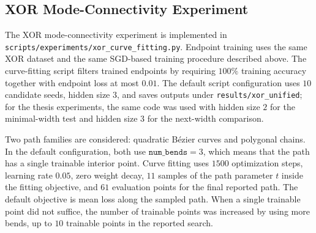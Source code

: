 \documentclass[11pt,a4paper]{report}
\begin{document}
\subsection{XOR Mode-Connectivity Experiment}

The XOR mode-connectivity experiment is implemented in \texttt{scripts/experiments/xor\_curve\_fitting.py}. Endpoint training uses the same XOR dataset and the same SGD-based training procedure described above. The curve-fitting script filters trained endpoints by requiring \(100\%\) training accuracy together with endpoint loss at most \(0.01\). The default script configuration uses \(10\) candidate seeds, hidden size \(3\), and saves outputs under \texttt{results/xor\_unified}; for the thesis experiments, the same code was used with hidden size \(2\) for the minimal-width test and hidden size \(3\) for the next-width comparison.

Two path families are considered: quadratic Bézier curves and polygonal chains. In the default configuration, both use \(\texttt{num\_bends}=3\), which means that the path has a single trainable interior point. Curve fitting uses \(1500\) optimization steps, learning rate \(0.05\), zero weight decay, \(11\) samples of the path parameter \(t\) inside the fitting objective, and \(61\) evaluation points for the final reported path. The default objective is mean loss along the sampled path. When a single trainable point did not suffice, the number of trainable points was increased by using more bends, up to \(10\) trainable points in the reported search.




\end{document}
